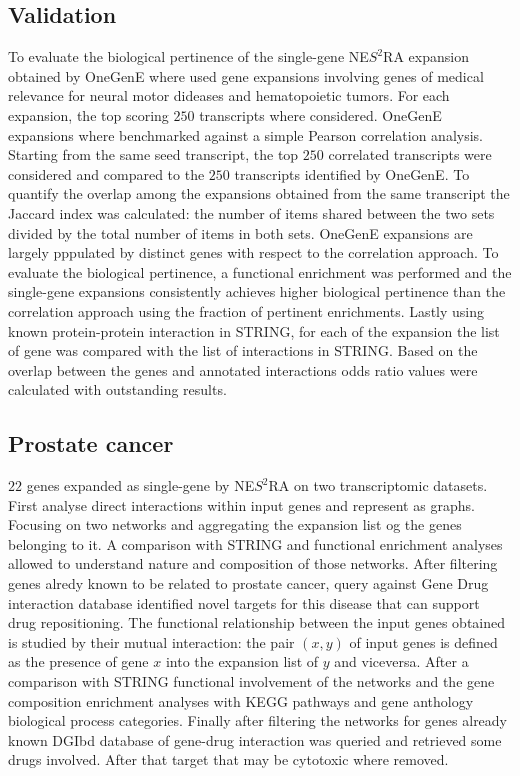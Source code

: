 	\subsection{Validation}
	To evaluate the biological pertinence of the single-gene NE$S^2$RA expansion obtained by OneGenE where used gene expansions involving genes of medical relevance for neural motor dideases and hematopoietic tumors.
	For each expansion, the top scoring $250$ transcripts where considered.
	OneGenE expansions where benchmarked against a simple Pearson correlation analysis.
	Starting from the same seed transcript, the top $250$ correlated transcripts were considered and compared to the $250$ transcripts identified by OneGenE.
	To quantify the overlap among the expansions obtained from the same transcript the Jaccard index was calculated: the number of items shared between the two sets divided by the total number of items in both sets.
	OneGenE expansions are largely pppulated by distinct genes with respect to the correlation approach.
	To evaluate the biological pertinence, a functional enrichment was performed and the single-gene expansions consistently achieves higher biological pertinence than the correlation approach using the fraction of pertinent enrichments.
	Lastly using known protein-protein interaction in STRING, for each of the expansion the list of gene was compared with the list of interactions in STRING.
	Based on the overlap between the genes and annotated interactions odds ratio values were calculated with outstanding results.

	\subsection{Prostate cancer}
	$22$ genes expanded as single-gene by NE$S^2$RA on two transcriptomic datasets.
	First analyse direct interactions within input genes and represent as graphs.
	Focusing on two networks and aggregating  the expansion list og the genes belonging to it.
	A comparison with STRING and functional enrichment analyses allowed to understand nature and composition of those networks.
	After filtering genes alredy known to be related to prostate cancer, query against Gene Drug interaction database identified novel targets for this disease that can support drug repositioning.
	The functional relationship between the input genes obtained is studied by their mutual interaction: the pair $(x,y)$ of input genes is defined as the presence of gene $x$ into the expansion list of $y$ and viceversa.
	After a comparison with STRING functional involvement of the networks and the gene composition enrichment analyses with KEGG pathways and gene anthology biological process categories.
	Finally after filtering the networks for genes already known DGIbd database of gene-drug interaction was queried and retrieved some drugs involved.
	After that target that may be cytotoxic where removed.

